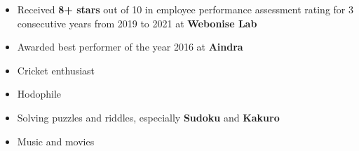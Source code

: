 \documentclass[10pt,a4paper,ragged2e,withhyper]{altacv}
\begin{document}
\begin{paracol}{2}

\begin{itemize}
    \item Received \textbf{8+ stars} out of 10 in employee performance assessment rating for 3 consecutive years from 2019 to 2021 at \textbf{Webonise Lab}
    \item Awarded best performer of the year 2016 at \textbf{Aindra}
\end{itemize}

\begin{itemize}
    \item Cricket enthusiast
    \item Hodophile
    \item Solving puzzles and riddles, especially \textbf{Sudoku} and \textbf{Kakuro}
    \item Music and movies
\end{itemize}


\newpage





\end{paracol}
\end{document}
